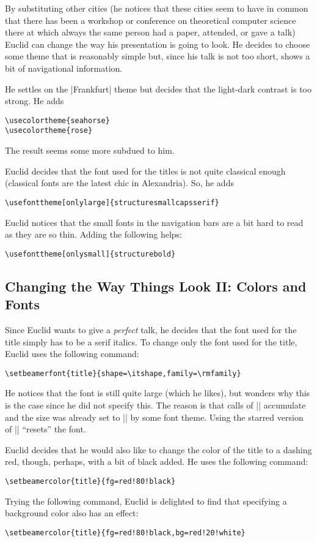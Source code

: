 By substituting other cities (he notices that these cities seem to have in common that there has been a workshop or conference on theoretical computer science there at which always the same person had a paper, attended, or gave a talk) Euclid can change the way his presentation is going to look. He decides to choose some theme that is reasonably simple but, since his talk is not too short, shows a bit of navigational information.

He settles on the |Frankfurt| theme but decides that the light-dark contrast is too strong. He adds
\begin{verbatim}
\usecolortheme{seahorse}
\usecolortheme{rose}
\end{verbatim}
The result seems some more subdued to him.

Euclid decides that the font used for the titles is not quite classical enough (classical fonts are the latest chic in Alexandria). So, he adds
\begin{verbatim}
\usefonttheme[onlylarge]{structuresmallcapsserif}
\end{verbatim}
Euclid notices that the small fonts in the navigation bars are a bit hard to read as they are so thin. Adding the following helps:
\begin{verbatim}
\usefonttheme[onlysmall]{structurebold}
\end{verbatim}


\subsection{Changing the Way Things Look II: Colors and Fonts}

Since Euclid wants to give a \emph{perfect} talk, he decides that the font used for the title simply has to be a serif italics. To change only the font used for the title, Euclid uses the following command:
\begin{verbatim}
\setbeamerfont{title}{shape=\itshape,family=\rmfamily}
\end{verbatim}

He notices that the font is still quite large (which he likes), but wonders why this is the case since he did not specify this. The reason is that calls of |\setbeamerfont| accumulate and the size was already set to |\large| by some font theme. Using the starred version of |\setbeamerfont| ``resets'' the font.

Euclid decides that he would also like to change the color of the title to a dashing red, though, perhaps, with a bit of black added. He uses the following command:
\begin{verbatim}
\setbeamercolor{title}{fg=red!80!black}
\end{verbatim}
Trying the following command, Euclid is delighted to find that specifying a background color also has an effect:
\begin{verbatim}
\setbeamercolor{title}{fg=red!80!black,bg=red!20!white}
\end{verbatim}

